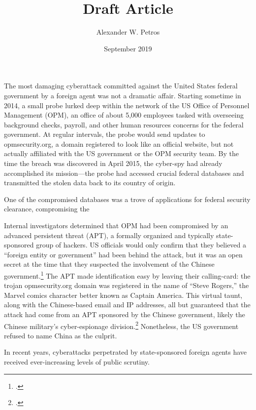 \documentclass[12pt]{article}
\title{Draft Article}
\author{Alexander W. Petros}
\date{September 2019}
\begin{document}
\maketitle
\newpage

The most damaging cyberattack committed against the United States federal government by a foreign agent was not a dramatic affair. Starting sometime in 2014, a small probe lurked deep within the network of the US Office of Personnel Management (OPM), an office of about 5,000 employees tasked with overseeing background checks, payroll, and other human resources concerns for the federal government. At regular intervals, the probe would send updates to opmsecurity.org, a domain registered to look like an official website, but not actually affiliated with the US government or the OPM security team. By the time the breach was discovered in April 2015, the cyber-spy had already accomplished its mission---the probe had accessed crucial federal databases and transmitted the stolen data back to its country of origin.

One of the compromised databases was a trove of applications for federal security clearance, compromising the

Internal investigators determined that OPM had been compromised by an advanced persistent threat (APT), a formally organized and typically state-sponsored group of hackers. US officials would only confirm that they believed a \enquote{foreign entity or government} had been behind the attack, but it was an open secret at the time that they suspected the involvement of the Chinese government.\footcite{spetalnick_china_2015} The APT made identification easy by leaving their calling-card: the trojan opmsecurity.org domain was registered in the name of \enquote{Steve Rogers,} the Marvel comics character better known as Captain America. This virtual taunt, along with the Chinese-based email and IP addresses, all but guaranteed that the attack had come from an APT sponsored by the Chinese government, likely the Chinese military's cyber-espionage division.\footcite{koerner_inside_2016} Nonetheless, the US government refused to name China as the culprit.

In recent years, cyberattacks perpetrated by state-sponsored foreign agents have received ever-increasing levels of public scrutiny.
\end{document}
